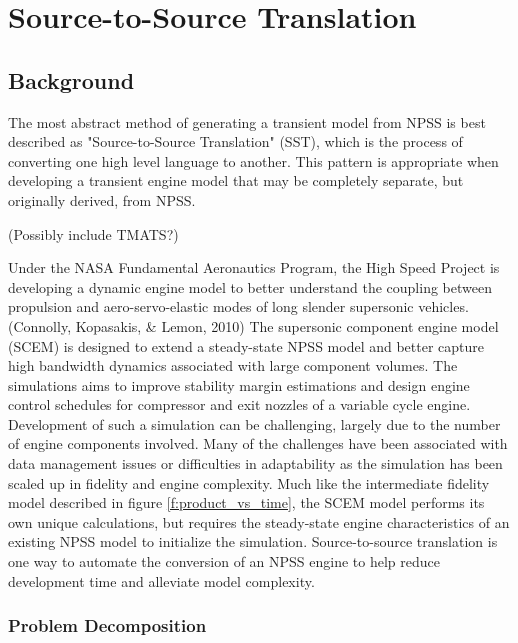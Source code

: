 \documentclass[heading.tex]{subfiles}
\begin{document}
\section{Source-to-Source Translation}
\subsection{Background}

The most abstract method of generating a transient model from NPSS is best described as "Source-to-Source Translation"
(SST), which is the process of converting one high level language to another. This pattern is appropriate when developing
a transient engine model that may be completely separate, but originally derived, from NPSS.


(Possibly include TMATS?)

	Under the NASA Fundamental Aeronautics Program, the High Speed Project is developing a dynamic engine model
to better understand the coupling between propulsion and  aero-servo-elastic modes of long slender
supersonic vehicles. (Connolly, Kopasakis, \& Lemon, 2010) The supersonic component engine model (SCEM) is 
designed to extend a steady-state NPSS model and better capture high bandwidth dynamics associated with large
component volumes. The simulations aims to improve stability margin estimations and design engine control schedules
for compressor and exit nozzles of a variable cycle engine. Development of such a simulation can be challenging,
largely due to the number of engine components involved. Many of the challenges have been associated with data
management issues or difficulties in adaptability as the simulation has been scaled up in fidelity and engine complexity. 
Much like the intermediate fidelity model described in figure \ref{f:product_vs_time}, the SCEM model performs its
own unique calculations, but requires the steady-state engine characteristics of an existing NPSS model to initialize
the simulation. Source-to-source translation is one way to automate the conversion of an NPSS engine to help
reduce development time and alleviate model complexity.

\subsubsection{Problem Decomposition}
\end{document}
